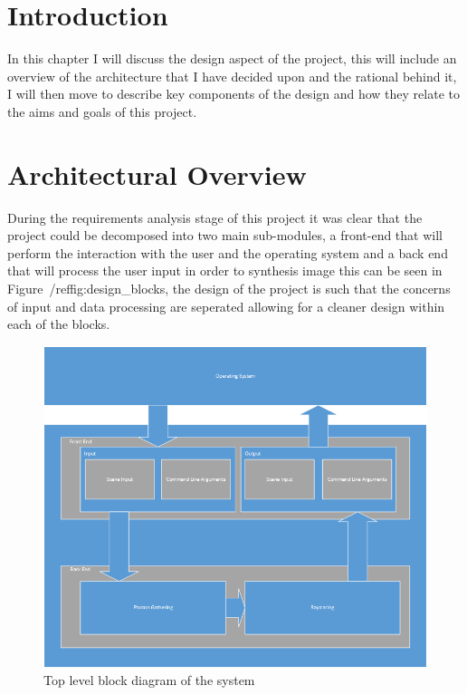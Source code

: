 \section{Introduction}
In this chapter I will discuss the design aspect of the project, this will include an overview of the
architecture that I have decided upon and the rational behind it, I will then move to describe key components of
the design and how they relate to the aims and goals of this project.

\section{Architectural Overview}
During the requirements analysis stage of this project it was clear that the project could be decomposed into
two main sub-modules, a front-end that will perform the interaction with the user and the operating system and a
back end that will process the user input in order to synthesis image this can be seen in 
Figure~/ref{fig:design\_blocks}, the design of the project is such that the concerns of input and data processing
are seperated allowing for a cleaner design within each of the blocks.

\begin{figure}
\centering
\includegraphics[scale=0.75]{./design/TopLevel.png}
\caption{Top level block diagram of the system}
\label{fig:design_blocks}
\end{figure}

\newpage

\newpage


